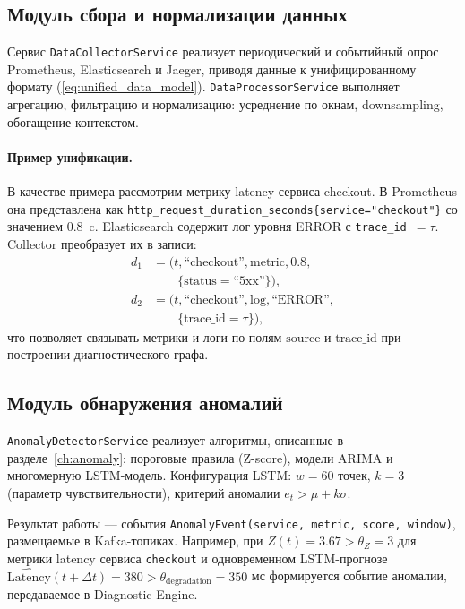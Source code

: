\subsection{Модуль сбора и нормализации данных}

Сервис \texttt{DataCollectorService} реализует периодический и событийный опрос Prometheus, Elasticsearch и Jaeger, приводя данные к унифицированному формату (\ref{eq:unified_data_model}). \texttt{DataProcessorService} выполняет агрегацию, фильтрацию и нормализацию: усреднение по окнам, downsampling, обогащение контекстом.

\paragraph{Пример унификации.}

В качестве примера рассмотрим метрику latency сервиса checkout. В Prometheus она представлена как \linebreak \texttt{http\_request\_duration\_seconds\{service="checkout"\}} со значением $0.8$~c. Elasticsearch содержит лог уровня ERROR с \texttt{trace\_id}~$= \tau$. Collector преобразует их в записи:
\begin{align*}
  d_1 &= (t, \text{``checkout''}, \text{metric}, 0.8, \\
      &\qquad \{\text{status} = \text{``5xx''}\}), \\
  d_2 &= (t, \text{``checkout''}, \text{log}, \text{``ERROR''}, \\
      &\qquad \{\text{trace\_id} = \tau\}),
\end{align*}
что позволяет связывать метрики и логи по полям \(\text{source}\) и \(\text{trace\_id}\) при построении диагностического графа.

\subsection{Модуль обнаружения аномалий}

\texttt{AnomalyDetectorService} реализует алгоритмы, описанные в разделе~\ref{ch:anomaly}: пороговые правила (Z-score), модели ARIMA и многомерную LSTM-модель. Конфигурация LSTM: $w = 60$ точек, $k = 3$ (параметр чувствительности), критерий аномалии $e_t > \mu + k\sigma$.

Результат работы --- события \linebreak \texttt{AnomalyEvent(service, metric, score, window)}, размещаемые в Kafka-топиках. Например, при $Z(t) = 3.67 > \theta_Z = 3$ для метрики latency сервиса \texttt{checkout} и одновременном LSTM-прогнозе $\hat{\text{Latency}}(t+\Delta t) = 380 > \theta_{\text{degradation}} = 350$ мс формируется событие аномалии, передаваемое в Diagnostic Engine.

